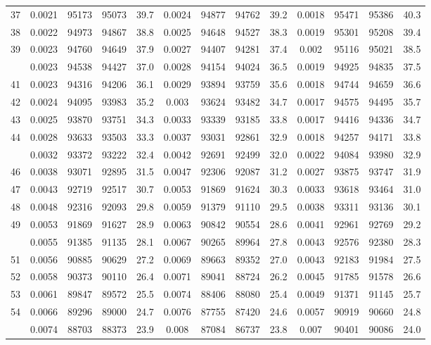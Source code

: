 \documentclass[
  14pt,
]{article}
\begin{document}
\begin{longtable}[t]{lcccccccccccc}
37 & 0.0021 & 95173 & 95073 & 39.7 & 0.0024 & 94877 & 94762 & 39.2 & 0.0018 & 95471 & 95386 & 40.3\\
38 & 0.0022 & 94973 & 94867 & 38.8 & 0.0025 & 94648 & 94527 & 38.3 & 0.0019 & 95301 & 95208 & 39.4\\
39 & 0.0023 & 94760 & 94649 & 37.9 & 0.0027 & 94407 & 94281 & 37.4 & 0.002 & 95116 & 95021 & 38.5\\
\addlinespace
40 & 0.0023 & 94538 & 94427 & 37.0 & 0.0028 & 94154 & 94024 & 36.5 & 0.0019 & 94925 & 94835 & 37.5\\
41 & 0.0023 & 94316 & 94206 & 36.1 & 0.0029 & 93894 & 93759 & 35.6 & 0.0018 & 94744 & 94659 & 36.6\\
42 & 0.0024 & 94095 & 93983 & 35.2 & 0.003 & 93624 & 93482 & 34.7 & 0.0017 & 94575 & 94495 & 35.7\\
43 & 0.0025 & 93870 & 93751 & 34.3 & 0.0033 & 93339 & 93185 & 33.8 & 0.0017 & 94416 & 94336 & 34.7\\
44 & 0.0028 & 93633 & 93503 & 33.3 & 0.0037 & 93031 & 92861 & 32.9 & 0.0018 & 94257 & 94171 & 33.8\\
\addlinespace
45 & 0.0032 & 93372 & 93222 & 32.4 & 0.0042 & 92691 & 92499 & 32.0 & 0.0022 & 94084 & 93980 & 32.9\\
46 & 0.0038 & 93071 & 92895 & 31.5 & 0.0047 & 92306 & 92087 & 31.2 & 0.0027 & 93875 & 93747 & 31.9\\
47 & 0.0043 & 92719 & 92517 & 30.7 & 0.0053 & 91869 & 91624 & 30.3 & 0.0033 & 93618 & 93464 & 31.0\\
48 & 0.0048 & 92316 & 92093 & 29.8 & 0.0059 & 91379 & 91110 & 29.5 & 0.0038 & 93311 & 93136 & 30.1\\
49 & 0.0053 & 91869 & 91627 & 28.9 & 0.0063 & 90842 & 90554 & 28.6 & 0.0041 & 92961 & 92769 & 29.2\\
\addlinespace
50 & 0.0055 & 91385 & 91135 & 28.1 & 0.0067 & 90265 & 89964 & 27.8 & 0.0043 & 92576 & 92380 & 28.3\\
51 & 0.0056 & 90885 & 90629 & 27.2 & 0.0069 & 89663 & 89352 & 27.0 & 0.0043 & 92183 & 91984 & 27.5\\
52 & 0.0058 & 90373 & 90110 & 26.4 & 0.0071 & 89041 & 88724 & 26.2 & 0.0045 & 91785 & 91578 & 26.6\\
53 & 0.0061 & 89847 & 89572 & 25.5 & 0.0074 & 88406 & 88080 & 25.4 & 0.0049 & 91371 & 91145 & 25.7\\
54 & 0.0066 & 89296 & 89000 & 24.7 & 0.0076 & 87755 & 87420 & 24.6 & 0.0057 & 90919 & 90660 & 24.8\\
\addlinespace
55 & 0.0074 & 88703 & 88373 & 23.9 & 0.008 & 87084 & 86737 & 23.8 & 0.007 & 90401 & 90086 & 24.0\\

\end{longtable}
\end{document}
